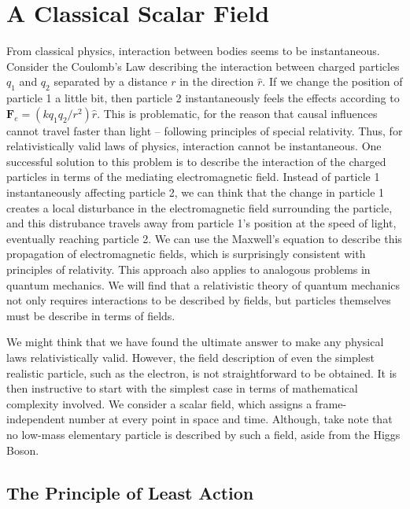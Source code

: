 \chapter{A Classical Scalar Field}

From classical physics, interaction between bodies seems to be instantaneous. Consider the Coulomb's Law describing the interaction between charged particles $q_1$ and $q_2$ separated by a distance $r$ in the direction $\hat{r}$. If we change the position of particle 1 a little bit, then particle 2 instantaneously feels the effects according to $\textbf{F}_e=(kq_1q_2/r^2)\hat{r}$. This is problematic, for the reason that causal influences cannot travel faster than light -- following principles of special relativity. Thus, for relativistically valid laws of physics, interaction cannot be instantaneous. One successful solution to this problem is to describe the interaction of the charged particles in terms of the mediating electromagnetic field. Instead of particle 1 instantaneously affecting particle 2, we can think that the change in particle 1 creates a local disturbance in the electromagnetic field surrounding the particle, and this distrubance travels away from particle 1's position at the speed of light, eventually reaching particle 2. We can use the Maxwell's equation to describe this propagation of electromagnetic fields, which is surprisingly consistent with principles of relativity. This approach also applies to analogous problems in quantum mechanics. We will find that a relativistic theory of quantum mechanics not only requires interactions to be described by fields, but particles themselves must be describe in terms of fields.

We might think that we have found the ultimate answer to make any physical laws relativistically valid. However, the field description of even the simplest realistic particle, such as the electron, is not straightforward to be obtained. It is then instructive to start with the simplest case in terms of mathematical complexity involved. We consider a scalar field, which assigns a frame-independent number at every point in space and time. Although, take note that no low-mass elementary particle is described by such a field, aside from the Higgs Boson.

\section{The Principle of Least Action}
